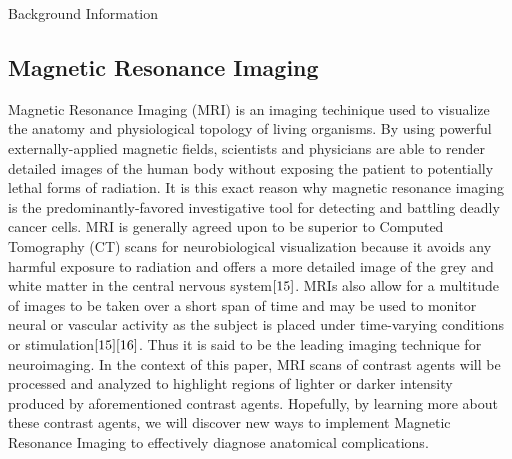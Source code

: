 \documentclass[a4paper,12pt]{article}
\begin{document}
\begin{section}{Background Information}

\subsection{Magnetic Resonance Imaging}
Magnetic Resonance Imaging (MRI) is an imaging techinique used to visualize the anatomy and physiological topology of living organisms. By using powerful externally-applied magnetic fields, scientists and physicians are able to render detailed images of the human body without exposing the patient to potentially lethal forms of radiation. It is this exact reason why magnetic resonance imaging is the predominantly-favored investigative tool for detecting and battling deadly cancer cells. MRI is generally agreed upon to be superior to Computed Tomography (CT) scans for neurobiological visualization because it avoids any harmful exposure to radiation and offers a more detailed image of the grey and white matter in the central nervous system$\cite{15}$.
MRIs also allow for a multitude of images to be taken over a short span of time and may be used to monitor neural or vascular activity as the subject is placed under time-varying conditions or stimulation$\cite{15}\cite{16}$.
Thus it is said to be the leading imaging technique for neuroimaging. In the context of this paper, MRI scans of contrast agents will be processed and analyzed to highlight regions of lighter or darker intensity produced by aforementioned contrast agents. Hopefully, by learning more about these contrast agents, we will discover new ways to implement Magnetic Resonance Imaging to effectively diagnose anatomical complications.


\end{section}
\end{document}

